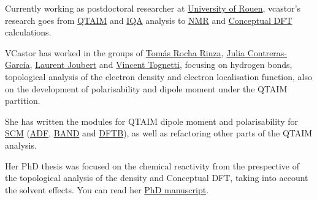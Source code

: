 Currently working as postdoctoral researcher at
\href{https://www.univ-rouen.fr/university-of-rouen-normandy/}{University of Rouen},
vcastor's research goes from \href{https://application.wiley-vch.de/books/sample/3527307486_c01.pdf}{QTAIM}
and \href{https://www.mdpi.com/1420-3049/25/17/4028}{IQA} analysis to \href{https://en.wikipedia.org/wiki/Nuclear_magnetic_resonance}{NMR} and
\href{https://pubs.acs.org/doi/pdf/10.1021/cr990029p?ref=article_openPDF}{Conceptual DFT} calculations.

VCastor has worked in the groups
of \href{https://iquimica.unam.mx/academicos/dr-tomas-rocha-rinza/}{Tom\'as Rocha Rinza},
\href{https://www.lct.jussieu.fr/pagesperso/contrera/}{Julia Contreras-Garc\'ia},
\href{https://www.lab-cobra.fr/annuaire/joubert-laurent/}{Laurent Joubert} and
\href{https://www.lab-cobra.fr/annuaire/tognetti-vincent/}{Vincent Tognetti},
focusing on hydrogen bonds, topological analysis of the electron density
and electron localisation function, also on the development of
polarisability and dipole moment under the QTAIM partition.

She has written the modules for QTAIM dipole moment and polarisability
for \href{https://www.scm.com}{SCM}
(\href{https://www.scm.com/amsterdam-modeling-suite/adf/}{ADF},
\href{https://www.scm.com/amsterdam-modeling-suite/periodic-dft-band-quantum-espresso/}{BAND}
and \href{https://www.scm.com/amsterdam-modeling-suite/dftb-mopac/}{DFTB}),
as well as refactoring other parts of the QTAIM analysis.

Her PhD thesis was focused on the chemical reactivity from the prespective
of the topological analysis of the density and Conceptual DFT, taking into
account the solvent effects. You can read
her \href{https://github.com/vcastor/PhDManuscript/blob/main/tesis.pdf}{PhD manuscript}.
